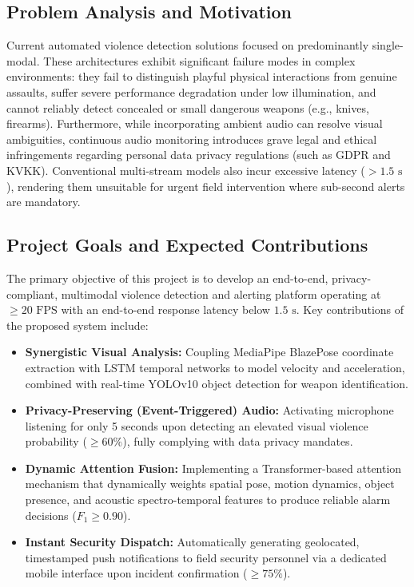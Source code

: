\documentclass[11pt,a4paper]{article}
\begin{document}
	\subsection{Problem Analysis and Motivation}
	Current automated violence detection solutions focused on predominantly single-modal. These architectures exhibit significant failure modes in complex environments: they fail to distinguish playful physical interactions from genuine assaults, suffer severe performance degradation under low illumination, and cannot reliably detect concealed or small dangerous weapons (e.g., knives, firearms). Furthermore, while incorporating ambient audio can resolve visual ambiguities, continuous audio monitoring introduces grave legal and ethical infringements regarding personal data privacy regulations (such as GDPR and KVKK). Conventional multi-stream models also incur excessive latency ($>1.5\text{ s}$), rendering them unsuitable for urgent field intervention where sub-second alerts are mandatory.
	
	\subsection{Project Goals and Expected Contributions}
	The primary objective of this project is to develop an end-to-end, privacy-compliant, multimodal violence detection and alerting platform operating at $\ge 20\text{ FPS}$ with an end-to-end response latency below $1.5\text{ s}$. Key contributions of the proposed system include:
	\begin{itemize}[leftmargin=*,noitemsep,topsep=2pt]
		\item \textbf{Synergistic Visual Analysis:} Coupling MediaPipe BlazePose coordinate extraction with LSTM temporal networks to model velocity and acceleration, combined with real-time YOLOv10 object detection for weapon identification.
		\item \textbf{Privacy-Preserving (Event-Triggered) Audio:} Activating microphone listening for only 5 seconds upon detecting an elevated visual violence probability ($\ge 60\%$), fully complying with data privacy mandates.
		\item \textbf{Dynamic Attention Fusion:} Implementing a Transformer-based attention mechanism that dynamically weights spatial pose, motion dynamics, object presence, and acoustic spectro-temporal features to produce reliable alarm decisions ($F_1 \ge 0.90$).
		\item \textbf{Instant Security Dispatch:} Automatically generating geolocated, timestamped push notifications to field security personnel via a dedicated mobile interface upon incident confirmation ($\ge 75\%$).
	\end{itemize}
	
\end{document}

